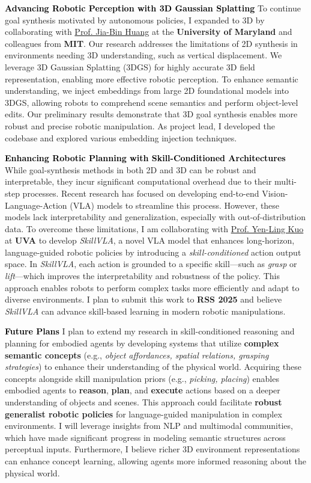 \documentclass[12pt]{article}
\newcommand{\statement}[1]{\medskip\noindent
  \textcolor{black}{\textbf{#1}}\space
}
\begin{document}
\statement{Advancing Robotic Perception with 3D Gaussian Splatting} To continue goal synthesis motivated by autonomous policies, I expanded to 3D by collaborating with \href{https://jbhuang0604.github.io/}{Prof. Jia-Bin Huang} at the \textbf{University of Maryland} and colleagues from \textbf{MIT}. Our research addresses the limitations of 2D synthesis in environments needing 3D understanding, such as vertical displacement. We leverage 3D Gaussian Splatting (3DGS) for highly accurate 3D field representation, enabling more effective robotic perception. To enhance semantic understanding, we inject embeddings from large 2D foundational models into 3DGS, allowing robots to comprehend scene semantics and perform object-level edits. Our preliminary results demonstrate that 3D goal synthesis enables more robust and precise robotic manipulation. As project lead, I developed the codebase and explored various embedding injection techniques.

\statement{Enhancing Robotic Planning with Skill-Conditioned Architectures} While goal-synthesis methods in both 2D and 3D can be robust and interpretable, they incur significant computational overhead due to their multi-step processes. Recent research has focused on developing end-to-end Vision-Language-Action (VLA) models to streamline this process. However, these models lack interpretability and generalization, especially with out-of-distribution data. To overcome these limitations, I am collaborating with \href{https://yenlingkuo.com/}{Prof. Yen-Ling Kuo} at \textbf{UVA} to develop \textit{SkillVLA}, a novel VLA model that enhances long-horizon, language-guided robotic policies by introducing a \textit{skill-conditioned} action output space. In \textit{SkillVLA}, each action is grounded to a specific skill—such as \textit{grasp} or \textit{lift}—which improves the interpretability and robustness of the policy. This approach enables robots to perform complex tasks more efficiently and adapt to diverse environments. I plan to submit this work to \textbf{RSS 2025} and believe \textit{SkillVLA} can advance skill-based learning in modern robotic manipulations.

\statement{Future Plans} I plan to extend my research in skill-conditioned reasoning and planning for embodied agents by developing systems that utilize \textbf{complex semantic concepts} (e.g., \textit{object affordances, spatial relations, grasping strategies}) to enhance their understanding of the physical world. Acquiring these concepts alongside skill manipulation priors (e.g., \textit{picking, placing}) enables embodied agents to \textbf{reason}, \textbf{plan}, and \textbf{execute} actions based on a deeper understanding of objects and scenes. This approach could facilitate \textbf{robust generalist robotic policies} for language-guided manipulation in complex environments. I will leverage insights from NLP and multimodal communities, which have made significant progress in modeling semantic structures across perceptual inputs. Furthermore, I believe richer 3D environment representations can enhance concept learning, allowing agents more informed reasoning about the physical world.
\end{document}
